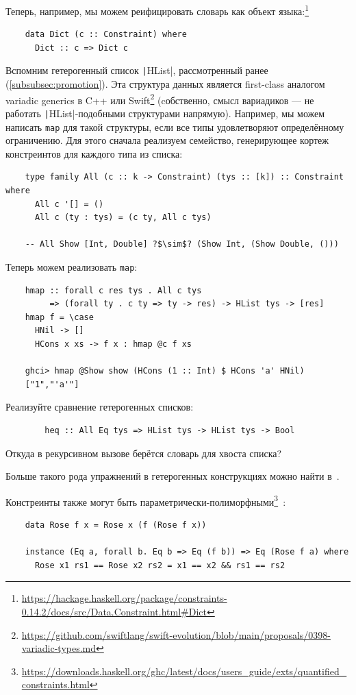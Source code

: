 Теперь, например, мы можем реифицировать словарь как объект языка:\footnote{\url{https://hackage.haskell.org/package/constraints-0.14.2/docs/src/Data.Constraint.html\#Dict}}
\begin{verbatim}
    data Dict (c :: Constraint) where
      Dict :: c => Dict c
\end{verbatim}

Вспомним гетерогенный список \texttt|HList|, рассмотренный ранее (\ref{subsubsec:promotion}).
Эта структура данных является first-class аналогом variadic generics в C++ или Swift\footnote{\url{https://github.com/swiftlang/swift-evolution/blob/main/proposals/0398-variadic-types.md}} (cобственно, смысл вариадиков --- не работать \texttt|HList|-подобными структурами напрямую).
Например, мы можем написать \texttt{map} для такой структуры, если все типы удовлетворяют определённому ограничению.
Для этого сначала реализуем семейство, генерирующее кортеж констреинтов для каждого типа из списка:
\begin{verbatim}
    type family All (c :: k -> Constraint) (tys :: [k]) :: Constraint where
      All c '[] = ()
      All c (ty : tys) = (c ty, All c tys)

    -- All Show [Int, Double] ?$\sim$? (Show Int, (Show Double, ()))
\end{verbatim}

Теперь можем реализовать \texttt{map}:
\begin{verbatim}
    hmap :: forall c res tys . All c tys
         => (forall ty . c ty => ty -> res) -> HList tys -> [res]
    hmap f = \case
      HNil -> []
      HCons x xs -> f x : hmap @c f xs

    ghci> hmap @Show show (HCons (1 :: Int) $ HCons 'a' HNil)
    ["1","'a'"]
\end{verbatim}

\begin{task}
    Реализуйте сравнение гетерогенных списков:
    \begin{verbatim}
        heq :: All Eq tys => HList tys -> HList tys -> Bool
    \end{verbatim}
    Откуда в рекурсивном вызове берётся словарь для хвоста списка?
\end{task}

Больше такого рода упражнений в гетерогенных конструкциях можно найти в~\cite{de2014true}.

Констреинты также могут быть параметрически-полиморфными\footnote{\url{https://downloads.haskell.org/ghc/latest/docs/users_guide/exts/quantified_constraints.html}}~\cite{bottu2017quantified}:
\begin{verbatim}
    data Rose f x = Rose x (f (Rose f x))

    instance (Eq a, forall b. Eq b => Eq (f b)) => Eq (Rose f a) where
      Rose x1 rs1 == Rose x2 rs2 = x1 == x2 && rs1 == rs2
\end{verbatim}

